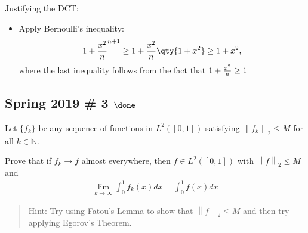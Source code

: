 \begin{solution}
Justifying the DCT:

\begin{itemize}
\tightlist
\item
  Apply Bernoulli's inequality:
  \begin{align*}
  {1 + {x^2\over n}}^{n+1} \geq {1 + {x^2\over n}}\qty{1 + x^2} \geq {1 + x^2}
  ,\end{align*}
  where the last inequality follows from the fact that
  \(1 + {x^2 \over n} \geq 1\)
\end{itemize}

\end{solution}

\hypertarget{spring-2019-3-done}{%
\subsection{\texorpdfstring{Spring 2019 \# 3
\(\done\)}{Spring 2019 \# 3 \textbackslash done}}\label{spring-2019-3-done}}

Let \(\{f_k\}\) be any sequence of functions in \(L^2([0, 1])\)
satisfying \({\left\lVert {f_k} \right\rVert}_2 ≤ M\) for all
\(k ∈ {\mathbb{N}}\).

Prove that if \(f_k \to f\) almost everywhere, then \(f ∈ L^2([0, 1])\)
with \({\left\lVert {f} \right\rVert}_2 ≤ M\) and
\begin{align*}
\lim _{k \rightarrow \infty} \int_{0}^{1} f_{k}(x) dx = \int_{0}^{1} f(x) d x
\end{align*}

\begin{quote}
Hint: Try using Fatou's Lemma to show that
\({\left\lVert {f} \right\rVert}_2 ≤ M\) and then try applying Egorov's
Theorem.
\end{quote}

